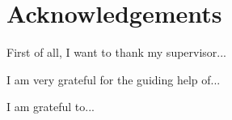 
\chapter*{Acknowledgements}
	
	First of all, I want to thank my supervisor...
\par
	I am very grateful for the guiding help of...
\par
	\vspace{\baselineskip}
	I am grateful to...
